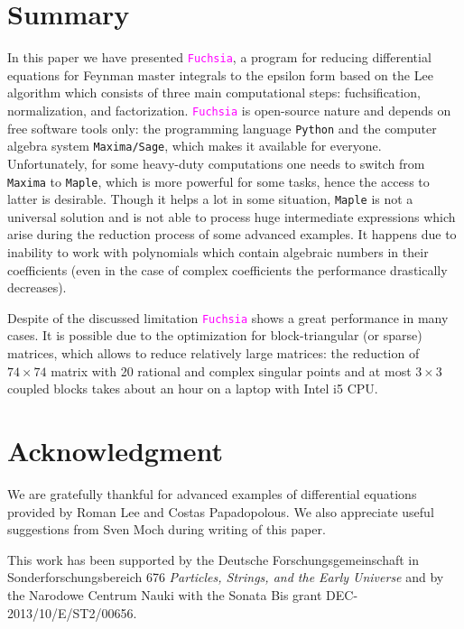 \documentclass{elsarticle}
\newcommand{\fuchsia}{\textcolor{fuchsia}{\texttt{Fuchsia}}\xspace}
\newcommand{\maple}{\texttt{Maple}\xspace}
\newcommand{\maxima}{\texttt{Maxima}\xspace}
\newcommand{\maximasage}{\texttt{Maxima/Sage}\xspace}
\newcommand{\python}{\texttt{Python}\xspace}
\begin{document}
\section{Summary}
\label{sec:4}

In this paper we have presented \fuchsia, a program for reducing differential equations for Feynman master integrals to the epsilon form based on the Lee algorithm \cite{Lee15} which consists of three main computational steps: fuchsification, normalization, and factorization.
\fuchsia is open-source nature and depends on free software tools only: the programming language \python and the computer algebra system \maximasage, which makes it available for everyone.
Unfortunately, for some heavy-duty computations one needs to switch from \maxima to \maple, which is more powerful for some tasks, hence the access to latter is desirable.
Though it helps a lot in some situation, \maple is not a universal solution and is not able to process huge intermediate expressions which arise during the reduction process of some advanced examples.
It happens due to inability to work with polynomials which contain algebraic numbers in their coefficients (even in the case of complex coefficients the performance drastically decreases).

Despite of the discussed limitation \fuchsia shows a great performance in many cases.
It is possible due to the optimization for block-triangular (or sparse) matrices, which allows to reduce relatively large matrices: the reduction of ${74\times74}$ matrix with 20 rational and complex singular points and at most $3\times3$ coupled blocks takes about an hour on a laptop with Intel i5 CPU.

\section*{Acknowledgment}

We are gratefully thankful for advanced examples of differential equations provided by Roman Lee and Costas Papadopolous.
We also appreciate useful suggestions from Sven Moch during writing of this paper.

This work has been supported by the Deutsche Forschungsgemeinschaft in Sonderforschungs\-be\-reich 676 {\it Particles, Strings, and the Early Universe} and by the Narodowe Centrum Nauki with the Sonata Bis grant DEC-2013/10/E/ST2/00656.




\end{document}
